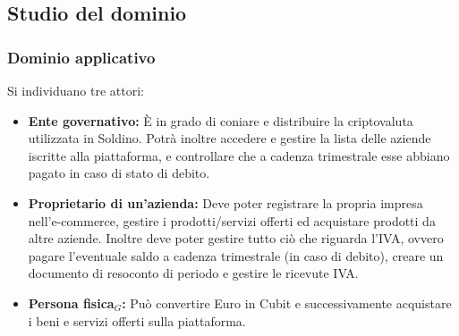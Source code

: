 \subsection{Studio del dominio}
\subsubsection{Dominio applicativo}
Si individuano tre attori:
\begin{itemize}	
	\item \textbf{Ente governativo: }\`E in grado di coniare e distribuire la 
	criptovaluta utilizzata in Soldino. Potrà inoltre accedere e gestire la lista delle aziende iscritte alla piattaforma, e controllare che a cadenza trimestrale esse abbiano pagato in caso di stato di debito.
	\item \textbf{Proprietario di un'azienda:} Deve poter registrare la propria impresa nell'e-commerce, gestire i prodotti/servizi offerti ed acquistare prodotti da altre aziende. Inoltre deve poter gestire tutto ciò che riguarda l'IVA, ovvero pagare l'eventuale saldo a cadenza trimestrale (in caso di debito), creare un documento di resoconto di periodo e gestire le ricevute IVA.
	\item \textbf{Persona fisica$_{G}$: }Può convertire Euro in Cubit e successivamente acquistare i beni e servizi offerti sulla piattaforma. 
\end{itemize}
